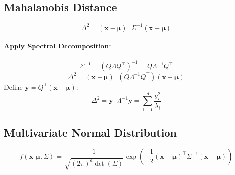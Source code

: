 \documentclass{article}
\begin{document}
\subsection{Mahalanobis Distance}
\[
    \Delta^2 = (\mathbf{x} - \boldsymbol{\mu})^\top \Sigma^{-1} (\mathbf{x} - \boldsymbol{\mu})
\]

\paragraph{Apply Spectral Decomposition:}
\[
    \Sigma^{-1} = (Q \Lambda Q^\top)^{-1} = Q \Lambda^{-1} Q^\top
\]
\[
    \Delta^2 = (\mathbf{x} - \boldsymbol{\mu})^\top (Q \Lambda^{-1} Q^\top) (\mathbf{x} - \boldsymbol{\mu})
\]
Define \( \mathbf{y} = Q^\top (\mathbf{x} - \boldsymbol{\mu}) \):
\[
    \Delta^2 = \mathbf{y}^\top \Lambda^{-1} \mathbf{y} = \sum_{i=1}^{d} \frac{y_i^2}{\lambda_i}
\]

\subsection{Multivariate Normal Distribution}
\[
    f(\mathbf{x}; \boldsymbol{\mu}, \Sigma) = \frac{1}{\sqrt{(2\pi)^d\det(\Sigma)}} \exp\left(-\frac{1}{2}(\mathbf{x} - \boldsymbol{\mu})^\top \Sigma^{-1} (\mathbf{x} - \boldsymbol{\mu})\right)
\]
\end{document}
